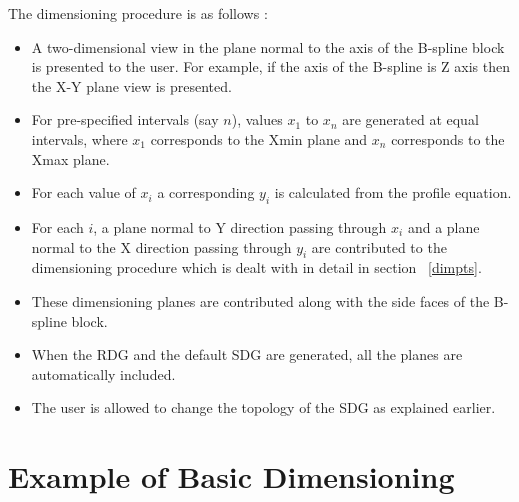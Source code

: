 		The dimensioning procedure is as follows :
            \begin{itemize}

            \item
            A two-dimensional view in the plane normal to the axis of the
				B-spline block is presented to the user. For example, if the
			axis of the B-spline is Z axis then the X-Y plane view is presented.

            \item
            For pre-specified intervals (say $n$), values $x_{1}$ to $x_{n}$
            are generated at equal intervals, where $x_{1}$ corresponds to the
			Xmin plane and $x_{n}$ corresponds to the Xmax plane.

            \item
            For each value of $x_{i}$ a corresponding $y_{i}$ is calculated
            from the profile equation.

            \item
            For each $i$, a plane normal to Y direction passing through $x_{i}$ 			and a plane normal to the X direction passing through $y_{i}$ are 
			contributed to the dimensioning procedure which is dealt with in 
			detail in section ~\ref{dimpts}.

	\item
	These dimensioning planes are contributed along with the side faces of the
	B-spline block.
	\item
	When the RDG and the default SDG are generated, all the planes are
	automatically included.

	\item
	The user is allowed to change the topology of the SDG as explained earlier.
	\end{itemize}

\section{Example of Basic Dimensioning}


